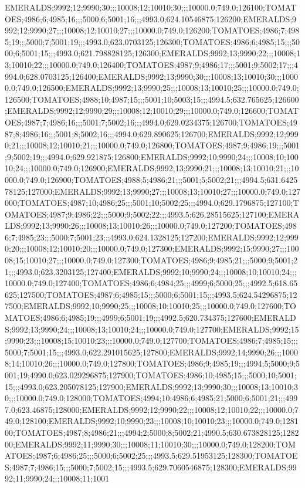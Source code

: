 EMERALDS;9992;12;9990;30;;;10008;12;10010;30;;;10000.0;749.0;126100;TOMATOES;4986;6;4985;16;;;5000;6;5001;16;;;4993.0;624.10546875;126200;EMERALDS;9992;12;9990;27;;;10008;12;10010;27;;;10000.0;749.0;126200;TOMATOES;4986;7;4985;19;;;5000;7;5001;19;;;4993.0;623.0703125;126300;TOMATOES;4986;6;4985;15;;;5000;6;5001;15;;;4993.0;621.798828125;126300;EMERALDS;9992;13;9990;22;;;10008;13;10010;22;;;10000.0;749.0;126400;TOMATOES;4987;9;4986;17;;;5001;9;5002;17;;;4994.0;628.0703125;126400;EMERALDS;9992;13;9990;30;;;10008;13;10010;30;;;10000.0;749.0;126500;EMERALDS;9992;13;9990;25;;;10008;13;10010;25;;;10000.0;749.0;126500;TOMATOES;4988;10;4987;15;;;5001;10;5003;15;;;4994.5;632.765625;126600;EMERALDS;9992;12;9990;29;;;10008;12;10010;29;;;10000.0;749.0;126600;TOMATOES;4987;7;4986;16;;;5001;7;5002;16;;;4994.0;629.0234375;126700;TOMATOES;4987;8;4986;16;;;5001;8;5002;16;;;4994.0;629.890625;126700;EMERALDS;9992;12;9990;21;;;10008;12;10010;21;;;10000.0;749.0;126800;TOMATOES;4987;9;4986;19;;;5001;9;5002;19;;;4994.0;629.921875;126800;EMERALDS;9992;10;9990;24;;;10008;10;10010;24;;;10000.0;749.0;126900;EMERALDS;9992;13;9990;21;;;10008;13;10010;21;;;10000.0;749.0;126900;TOMATOES;4988;5;4986;21;;;5001;5;5002;21;;;4994.5;631.642578125;127000;EMERALDS;9992;13;9990;27;;;10008;13;10010;27;;;10000.0;749.0;127000;TOMATOES;4987;10;4986;25;;;5001;10;5002;25;;;4994.0;629.1796875;127100;TOMATOES;4987;9;4986;22;;;5000;9;5002;22;;;4993.5;626.28515625;127100;EMERALDS;9992;13;9990;26;;;10008;13;10010;26;;;10000.0;749.0;127200;TOMATOES;4986;7;4985;23;;;5000;7;5001;23;;;4993.0;624.1328125;127200;EMERALDS;9992;12;9990;20;;;10008;12;10010;20;;;10000.0;749.0;127300;EMERALDS;9992;15;9990;27;;;10008;15;10010;27;;;10000.0;749.0;127300;TOMATOES;4986;9;4985;21;;;5000;9;5001;21;;;4993.0;623.3203125;127400;EMERALDS;9992;10;9990;24;;;10008;10;10010;24;;;10000.0;749.0;127400;TOMATOES;4986;6;4984;25;;;4999;6;5000;25;;;4992.5;618.65625;127500;TOMATOES;4987;6;4985;15;;;5000;6;5001;15;;;4993.5;624.54296875;127500;EMERALDS;9992;10;9990;25;;;10008;10;10010;25;;;10000.0;749.0;127600;TOMATOES;4986;6;4985;19;;;4999;6;5001;19;;;4992.5;620.734375;127600;EMERALDS;9992;13;9990;24;;;10008;13;10010;24;;;10000.0;749.0;127700;EMERALDS;9992;15;9990;23;;;10008;15;10010;23;;;10000.0;749.0;127700;TOMATOES;4986;7;4985;15;;;5000;7;5001;15;;;4993.0;622.291015625;127800;EMERALDS;9992;14;9990;26;;;10008;14;10010;26;;;10000.0;749.0;127800;TOMATOES;4986;9;4985;19;;;4994;5;5000;9;5001;19;4990.0;623.029296875;127900;TOMATOES;4986;10;4985;15;;;5000;10;5001;15;;;4993.0;623.205078125;127900;EMERALDS;9992;13;9990;30;;;10008;13;10010;30;;;10000.0;749.0;128000;TOMATOES;4994;10;4986;6;4985;21;5000;6;5001;21;;;4997.0;623.46875;128000;EMERALDS;9992;12;9990;22;;;10008;12;10010;22;;;10000.0;749.0;128100;EMERALDS;9992;10;9990;23;;;10008;10;10010;23;;;10000.0;749.0;128100;TOMATOES;4987;8;4986;21;;;4994;2;5000;8;5002;21;4990.5;630.673828125;128200;EMERALDS;9992;11;9990;30;;;10008;11;10010;30;;;10000.0;749.0;128200;TOMATOES;4987;6;4986;25;;;5000;6;5002;25;;;4993.5;629.51953125;128300;TOMATOES;4987;7;4986;15;;;5000;7;5002;15;;;4993.5;629.7060546875;128300;EMERALDS;9992;11;9990;24;;;10008;11;1001